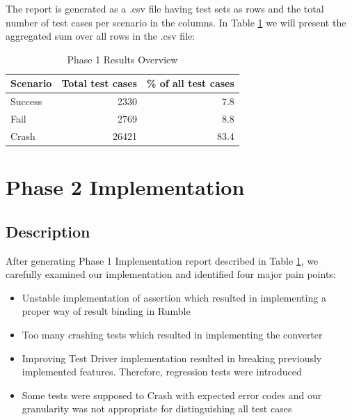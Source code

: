 The report is generated as a .csv file having test sets as rows and the total number of test cases per scenario in the columns. In Table \ref{tab:Phase1_ResultTable} we will present the aggregated sum over all rows in the .csv file:
\begin{table}[h!]
	\centering
	\begin{tabular}{|l|r|r|}
		\hline
		\multicolumn{1}{|c|}{Scenario} & \multicolumn{1}{c|}{Total test cases} & \multicolumn{1}{c|}{\% of all test cases} \\ \hline
		Success                        & 2330                                  & 7.8                                       \\ \hline
		Fail                           & 2769                                  & 8.8                                       \\ \hline
		Crash                          & 26421                                 & 83.4                                      \\ \hline
	\end{tabular}
 	\caption{Phase 1 Results Overview}
 	\label{tab:Phase1_ResultTable}
\end{table}

\section{Phase 2 Implementation}
\subsection{Description}
\label{Phase2_Description}
After generating Phase 1 Implementation report described in Table \ref{tab:Phase1_ResultTable}, we carefully examined our implementation and identified four major pain points:
\begin{itemize}
	\item Unstable implementation of assertion which resulted in implementing a proper way of result binding in Rumble
	\item Too many crashing tests which resulted in implementing the converter
	\item Improving Test Driver implementation resulted in breaking previously implemented features. Therefore, regression tests were introduced
	\item Some tests were supposed to Crash with expected error codes and our granularity was not appropriate for distinguishing all test cases
\end{itemize}

